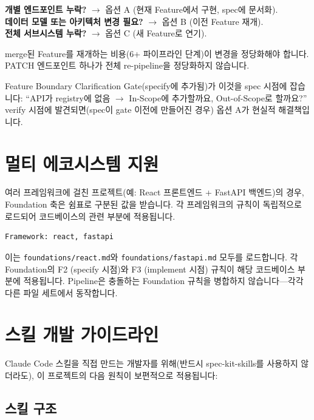 \documentclass[11pt,a4paper,openright,twoside]{report}
\newcommand{\file}[1]{\texttt{#1}}
\begin{document}
\begin{tipbox}[결정 휴리스틱]
\textbf{개별 엔드포인트 누락?} $\rightarrow$ 옵션 A (현재 Feature에서 구현, spec에 문서화).\\
\textbf{데이터 모델 또는 아키텍처 변경 필요?} $\rightarrow$ 옵션 B (이전 Feature 재개).\\
\textbf{전체 서브시스템 누락?} $\rightarrow$ 옵션 C (새 Feature로 연기).

merge된 Feature를 재개하는 비용(6+ 파이프라인 단계)이 변경을 정당화해야 합니다. PATCH 엔드포인트 하나가 전체 re-pipeline을 정당화하지 않습니다.
\end{tipbox}

Feature Boundary Clarification Gate(specify에 추가됨)가 이것을 spec 시점에 잡습니다: ``API가 registry에 없음 $\rightarrow$ In-Scope에 추가할까요, Out-of-Scope로 할까요?'' verify 시점에 발견되면(spec이 gate 이전에 만들어진 경우) 옵션 A가 현실적 해결책입니다.

\section{멀티 에코시스템 지원}

여러 프레임워크에 걸친 프로젝트(예: React 프론트엔드 + FastAPI 백엔드)의 경우, Foundation 축은 쉼표로 구분된 값을 받습니다. 각 프레임워크의 규칙이 독립적으로 로드되어 코드베이스의 관련 부분에 적용됩니다.

\begin{lstlisting}[title={Multi-Framework Domain Profile}]
Framework: react, fastapi
\end{lstlisting}

이는 \file{foundations/react.md}와 \file{foundations/fastapi.md} 모두를 로드합니다. 각 Foundation의 F2 (specify 시점)와 F3 (implement 시점) 규칙이 해당 코드베이스 부분에 적용됩니다. Pipeline은 충돌하는 Foundation 규칙을 병합하지 않습니다---각각 다른 파일 세트에서 동작합니다.

\section{스킬 개발 가이드라인}

Claude Code 스킬을 직접 만드는 개발자를 위해(반드시 spec-kit-skills를 사용하지 않더라도), 이 프로젝트의 다음 원칙이 보편적으로 적용됩니다:

\subsection{스킬 구조}
\end{document}
